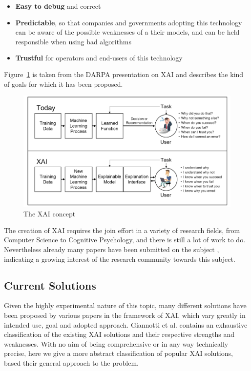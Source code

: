 \documentclass[conference]{IEEEtran}
\newcommand{\cit}[1][]{\todo[tickmarkheight=0.2cm]{cit #1}}
\begin{document}
\begin{itemize}
    \item \textbf{Easy to debug} and correct
    \item \textbf{Predictable}, so that companies and governments adopting this
          technology can be aware of the possible weaknesses of a their models,
          and can be held responsible when using bad algorithms
    \item \textbf{Trustful} for operators and end-users of this technology
\end{itemize}

Figure~\ref{fig:xai} is taken from the DARPA presentation on XAI and describes
the kind of goals for which it has been proposed.


\begin{figure}[h!] \includegraphics[width=\linewidth]{images/xai.png}
    \caption{The XAI concept  } \label{fig:xai} \end{figure}

The creation of XAI requires the join effort in a variety of research fields,
from Computer Science to Cognitive Psychology, and there is still a lot of work
to do. Nevertheless already many papers have been submitted on the subject \cit,
indicating a growing interest of the research community towards this subject.

\subsection{Current Solutions}
\label{sec:solutions}

Given the highly experimental nature of this topic, many different solutions
have been proposed by various papers in the framework of XAI, which vary greatly
in intended use, goal and adopted approach. Giannotti et al. \cit contains an exhaustive classification of the existing XAI
solutions and their respective strengths and weaknesses. With no aim of being
comprehensive or in any way technically precise, here we give a more abstract
classification of popular XAI solutions, based their general approach to the
problem.
\end{document}

